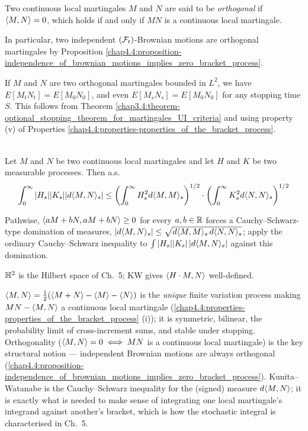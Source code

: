 \begin{definition}\label{chap4.4:definition-orthogonality_of_continous_local_martingales}
Two continuous local martingales $M$ and $N$ are said to be \textit{orthogonal} if $\langle M,N\rangle=0$, which holds if and only if $MN$ is a continuous local martingale.
\end{definition}
\begin{remark}\label{chap4.4:remark-remarks_on_orthogonality_of_continous_local_martingales}
In particular, two independent $(\mathcal{F}_t)$-Brownian motions are orthogonal martingales by Proposition \ref{chap4.4:proposition-independence_of_brownian_motions_implies_zero_bracket_process}.

If $M$ and $N$ are two orthogonal martingales bounded in $L^2$, we have $E[M_tN_t]=E[M_0N_0]$, and even $E[M_sN_s]=E[M_0N_0]$ for any stopping time $S$. This follows from Theorem \ref{chap3.4:theorem-optional_stopping_theorem_for_martingales_UI_criteria} and using property (v) of Properties \ref{chap4.4:properties-properties_of_the_bracket_process}.
\end{remark}

\begin{proposition}\label{chap4.4:proposition-kunita_watanabe}
 \\
Let $M$ and $N$ be two continuous local martingales and let $H$ and $K$ be two measurable processes. Then a.s.
$$
\int_0^\infty |H_s||K_s||d\langle M,N\rangle_s| \leq \left(
\int_0^\infty H_s^2 d\langle M,M\rangle_s
\right)^{1/2}
\cdot\left(
\int_0^\infty K_s^2 d\langle N,N\rangle_s
\right)^{1/2}
$$
\end{proposition}
\begin{proofidea}
Pathwise, $\langle aM+bN,aM+bN\rangle\ge0$ for every $a,b\in\mathbb{R}$ forces a Cauchy--Schwarz-type domination of measures, $|d\langle M,N\rangle_s|\le\sqrt{d\langle M,M\rangle_s\,d\langle N,N\rangle_s}$; apply the ordinary Cauchy--Schwarz inequality to $\int|H_s||K_s|\,|d\langle M,N\rangle_s|$ against this domination.
\end{proofidea}

\begin{usedin} $\mathbb{H}^2$ is the Hilbert space of Ch.\ 5; KW gives $\langle H\cdot M,N\rangle$ well-defined. \end{usedin}
\begin{quizbox} $\langle M,N\rangle=\tfrac12(\langle M+N\rangle-\langle M\rangle-\langle N\rangle)$ is the \emph{unique} finite variation process making $MN-\langle M,N\rangle$ a continuous local martingale (\cref{chap4.4:properties-properties_of_the_bracket_process} (i)); it is symmetric, bilinear, the probability limit of cross-increment sums, and stable under stopping. Orthogonality ($\langle M,N\rangle=0\iff MN$ is a continuous local martingale) is the key structural notion --- independent Brownian motions are always orthogonal (\cref{chap4.4:proposition-independence_of_brownian_motions_implies_zero_bracket_process}). Kunita--Watanabe is the Cauchy--Schwarz inequality for the (signed) measure $d\langle M,N\rangle$; it is exactly what is needed to make sense of integrating one local martingale's integrand against another's bracket, which is how the stochastic integral is characterised in Ch.\ 5. \end{quizbox}


